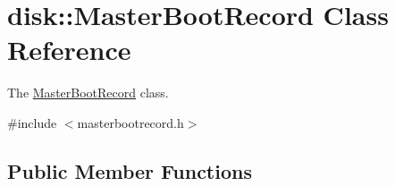 \hypertarget{classdisk_1_1_master_boot_record}{}\section{disk\+:\+:Master\+Boot\+Record Class Reference}
\label{classdisk_1_1_master_boot_record}


The \mbox{\hyperlink{classdisk_1_1_master_boot_record}{Master\+Boot\+Record}} class.  




{\ttfamily \#include $<$masterbootrecord.\+h$>$}

\subsection*{Public Member Functions}
